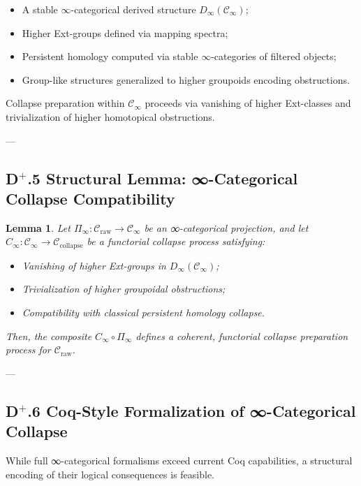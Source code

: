 \documentclass[11pt]{article}
\newtheorem{lemma}[theorem]{Lemma}
\begin{document}
\begin{itemize}
    \item A stable $\infty$-categorical derived structure $D_\infty(\mathcal{C}_\infty)$;
    \item Higher Ext-groups defined via mapping spectra;
    \item Persistent homology computed via stable $\infty$-categories of filtered objects;
    \item Group-like structures generalized to higher groupoids encoding obstructions.
\end{itemize}

Collapse preparation within $\mathcal{C}_\infty$ proceeds via vanishing of higher Ext-classes and trivialization of higher homotopical obstructions.

---

\subsection*{D$^{+}$.5 Structural Lemma: ∞-Categorical Collapse Compatibility}

\begin{lemma}
Let $\Pi_\infty : \mathcal{C}_{\mathrm{raw}} \to \mathcal{C}_\infty$ be an ∞-categorical projection, and let $C_\infty : \mathcal{C}_\infty \to \mathcal{C}_{\mathrm{collapse}}$ be a functorial collapse process satisfying:

\begin{itemize}
    \item Vanishing of higher Ext-groups in $D_\infty(\mathcal{C}_\infty)$;
    \item Trivialization of higher groupoidal obstructions;
    \item Compatibility with classical persistent homology collapse.
\end{itemize}

Then, the composite $C_\infty \circ \Pi_\infty$ defines a coherent, functorial collapse preparation process for $\mathcal{C}_{\mathrm{raw}}$.
\end{lemma}

---

\subsection*{D$^{+}$.6 Coq-Style Formalization of ∞-Categorical Collapse}

While full ∞-categorical formalisms exceed current Coq capabilities, a structural encoding of their logical consequences is feasible.
\end{document}
